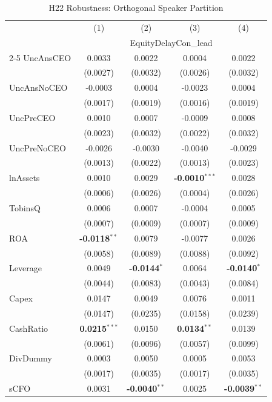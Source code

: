 \begin{landscape}
\begin{table}[H]
\setlength{\tabcolsep}{3pt}
\renewcommand{\arraystretch}{0.85}
\centering
\caption{H22 Robustness: Orthogonal Speaker Partition}
\label{tab:h22_robust}
\scriptsize
\begin{tabular}{lcccc}
\toprule
 & (1) & (2) & (3) & (4) \\
 & \multicolumn{4}{c}{EquityDelayCon\_lead} \\
\cmidrule(lr){2-5}
\midrule
UncAnsCEO & 0.0033 & 0.0022 & 0.0004 & 0.0022 \\
 & (0.0027) & (0.0032) & (0.0026) & (0.0032) \\
UncAnsNoCEO & -0.0003 & 0.0004 & -0.0023 & 0.0004 \\
 & (0.0017) & (0.0019) & (0.0016) & (0.0019) \\
UncPreCEO & 0.0010 & 0.0007 & -0.0009 & 0.0008 \\
 & (0.0023) & (0.0032) & (0.0022) & (0.0032) \\
UncPreNoCEO & -0.0026 & -0.0030 & -0.0040 & -0.0029 \\
 & (0.0013) & (0.0022) & (0.0013) & (0.0023) \\
\midrule
lnAssets & 0.0010 & 0.0029 & \textbf{-0.0010}$^{***}$ & 0.0028 \\
 & (0.0006) & (0.0026) & (0.0004) & (0.0026) \\
TobinsQ & 0.0006 & 0.0007 & -0.0004 & 0.0005 \\
 & (0.0007) & (0.0009) & (0.0007) & (0.0009) \\
ROA & \textbf{-0.0118}$^{**}$ & 0.0079 & -0.0077 & 0.0026 \\
 & (0.0058) & (0.0089) & (0.0088) & (0.0092) \\
Leverage & 0.0049 & \textbf{-0.0144}$^{*}$ & 0.0064 & \textbf{-0.0140}$^{*}$ \\
 & (0.0044) & (0.0083) & (0.0043) & (0.0084) \\
Capex & 0.0147 & 0.0049 & 0.0076 & 0.0011 \\
 & (0.0147) & (0.0235) & (0.0158) & (0.0239) \\
CashRatio & \textbf{0.0215}$^{***}$ & 0.0150 & \textbf{0.0134}$^{**}$ & 0.0139 \\
 & (0.0061) & (0.0096) & (0.0057) & (0.0099) \\
DivDummy & 0.0003 & 0.0050 & 0.0005 & 0.0053 \\
 & (0.0017) & (0.0035) & (0.0017) & (0.0035) \\
sCFO & 0.0031 & \textbf{-0.0040}$^{**}$ & 0.0025 & \textbf{-0.0039}$^{**}$ \\

\end{tabular}
\end{table}
\end{landscape}
